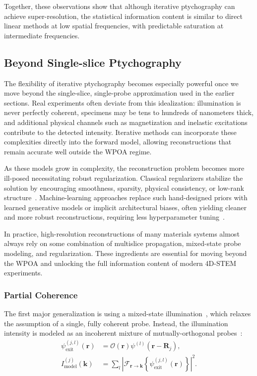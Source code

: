 \documentclass[pdflatex,sn-aps,iicol]{sn-jnl}%
\begin{document}
Together, these observations show that although iterative ptychography can achieve super-resolution, the statistical information content is similar to direct linear methods at low spatial frequencies, with predictable saturation at intermediate frequencies.

\subsection{Beyond Single-slice Ptychography}
\label{sec:beyond-ss}

The flexibility of iterative ptychography becomes especially powerful once we move beyond the single-slice, single-probe approximation used in the earlier sections.
Real experiments often deviate from this idealization: illumination is never perfectly coherent, specimens may be tens to hundreds of nanometers thick, and additional physical channels such as magnetization and inelastic excitations contribute to the detected intensity.
Iterative methods can incorporate these complexities directly into the forward model, allowing reconstructions that remain accurate well outside the WPOA regime.

As these models grow in complexity, the reconstruction problem becomes more ill-posed necessitating robust regularization.
Classical regularizers stabilize the solution by encouraging smoothness, sparsity, physical consistency, or low-rank structure~\cite{Varnavides_2023}.
Machine-learning approaches replace such hand-designed priors with learned generative models or implicit architectural biases, often yielding cleaner and more robust reconstructions, requiring less hyperparameter tuning~\cite{McCray_2025}.

In practice, high-resolution reconstructions of many materials systems almost always rely on some combination of multislice propagation, mixed-state probe modeling, and regularization.
These ingredients are essential for moving beyond the WPOA and unlocking the full information content of modern 4D-STEM experiments.

\subsubsection{Partial Coherence}

The first major generalization is using a mixed-state illumination~\cite{Thibault_2013,Chen_2020}, which relaxes the assumption of a single, fully coherent probe.
Instead, the illumination intensity is modeled as an incoherent mixture of mutually-orthogonal probes~\cite{Odstrcil_2016}:
\begin{align}
\psi_{\text{exit}}^{(j,l)}(\boldsymbol{r})
&=
\mathcal{O}(\boldsymbol{r})
\psi^{(l)}(\boldsymbol{r}-\boldsymbol{R}_j),\\
I_{\text{model}}^{(j)}(\boldsymbol{k})
&=
\sum_l
\left\lvert
\mathcal{F}_{\boldsymbol{r}\to\boldsymbol{k}}
\left\{
\psi_{\text{exit}}^{(j,l)}(\boldsymbol{r})
\right\}
\right\rvert^2.
\label{eq:mixed-state}
\end{align}
\end{document}
